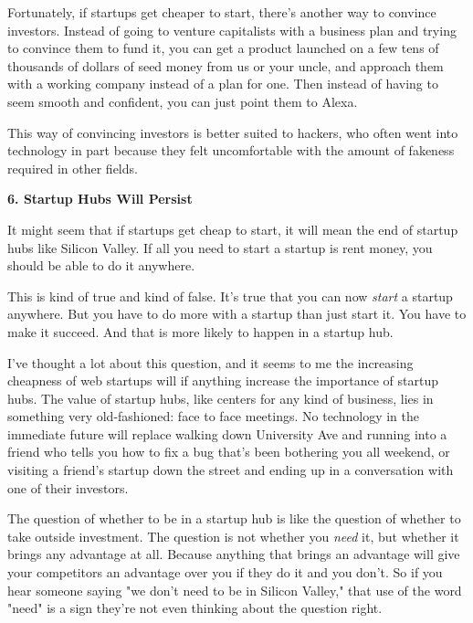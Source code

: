 Fortunately, if
                    startups get cheaper to start, there's another way to
                    convince investors. Instead of going to venture capitalists
                    with a business plan and trying to convince them to fund it,
                    you can get a product launched on a few tens of thousands of
                    dollars of seed money from us or your uncle, and approach
                    them with a working company instead of a plan for one. Then
                    instead of having to seem smooth and confident, you can just
                    point them to Alexa.

This way of convincing
                    investors is better suited to hackers, who often went into
                    technology in part because they felt uncomfortable with the
                    amount of fakeness required in other fields.

\textbf{6. Startup Hubs Will Persist}

It might seem that if startups get cheap to
                    start, it will mean the end of startup hubs like Silicon
                    Valley. If all you need to start a startup is rent money,
                    you should be able to do it anywhere.

This is
                    kind of true and kind of false. It's true that you can now
                    \emph{start} a startup anywhere. But you have to do more
                    with a startup than just start it. You have to make it
                    succeed. And that is more likely to happen in a startup
                    hub.

I've thought a lot about this question, and
                    it seems to me the increasing cheapness of web startups will
                    if anything increase the importance of startup hubs. The
                    value of startup hubs, like centers for any kind of
                    business, lies in something very old-fashioned: face to face
                    meetings. No technology in the immediate future will replace
                    walking down University Ave and running into a friend who
                    tells you how to fix a bug that's been bothering you all
                    weekend, or visiting a friend's startup down the street and
                    ending up in a conversation with one of their investors.

The
                    question of whether to be in a startup hub is like the
                    question of whether to take outside investment. The question
                    is not whether you \emph{need} it, but whether it brings any
                    advantage at all. Because anything that brings an advantage
                    will give your competitors an advantage over you if they do
                    it and you don't. So if you hear someone saying "we don't
                    need to be in Silicon Valley," that use of the word "need"
                    is a sign they're not even thinking about the question
                    right.

